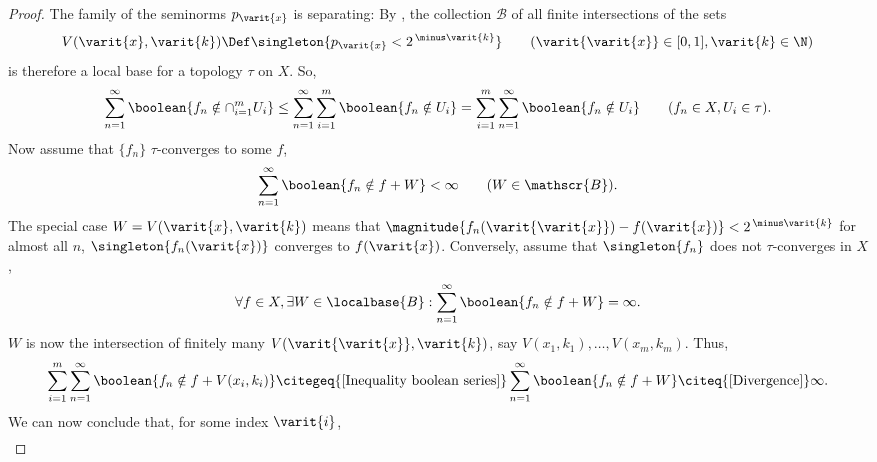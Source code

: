 \begin{proof}
%
The family of the seminorms $p_{\varit{x}}$ is separating: 
By , the collection $\mathscr{B}$ of all finite intersections 
of the sets 
%
  \begin{align}
    V(\varit{x},\varit{k})
      \Def 
    \singleton{p_\varit{x} < 2^{\,\minus \varit{k}}} 
      \quad\quad
    (\varit{\varit{x}} \in [0, 1], \varit{k} \in \N)
  \end{align}
%
is therefore a local base for a topology $\tau$ on $X$. 
So, 
%
  \begin{align}
    \label{Inequality boolean series}
    \sum_{n=1}^\infty \boolean{f_n \notin \cap_{i=1}^m U_i} \leq 
    \sum_{n=1}^\infty \sum_{i=1}^m \boolean{f_n \notin U_{i}} = 
    \sum_{i=1}^m \sum_{n=1}^\infty \boolean{f_n \notin U_i} %
    \quad\quad (f_n \in X, U_i \in \tau).
  \end{align}%
%
Now assume that $\{f_n\}$ $\tau$-converges to some $f$, \ie 
%
  \begin{align}
    \sum_{n=1}^\infty \boolean{f_n \notin f + W} < \infty \quad\quad (W \in \mathscr{B}).
  \end{align}
The special case %
%
$W = V(\varit{x}, \varit{k})$ %
%
means that %
%
  $\magnitude{f_n(\varit{\varit{x}}) - f(\varit{x})} < 2^{\,\minus \varit{k}}$ %
%
for almost all $n$,  \ie 
  $\singleton{f_n(\varit{x})}$ converges to $f(\varit{x})$. 
Conversely, assume that $\singleton{f_n}$ does not $\tau$-converges in $X$, \ie 
%
  \begin{align}
    \label{Divergence}
    \forall f \in X, \exists W \in \localbase{B}: 
      \sum_{n=1}^\infty\boolean{f_n \notin f +  W} = \infty. 
  \end{align}
%
$W$ is now the intersection of finitely many %
%
$V(\varit{\varit{x}}, \varit{k})$, %
%
say  
%
  $ V(x_1, k_1), \dots, V(x_m, k_m)$. Thus,  %
%
  \begin{align}
    \sum_{i=1}^m \sum_{n=1}^\infty \boolean{f_n \notin f + V(x_i, k_i)}
        \citegeq{\ref{Inequality boolean series}} 
    \sum_{n=1}^\infty \boolean{f_n \notin f + W}
      \citeq{\ref{Divergence}} 
    \infty .
  \end{align}
%
We can now conclude that, for some index $\varit{i}$, 
%
  \begin{align}

\end{align}
\end{proof}
